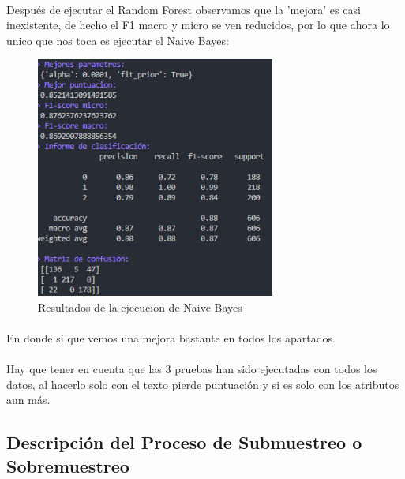 \documentclass{report}
\begin{document}
{{                \paragraph*{}{
                Después de ejecutar el Random Forest observamos que la 'mejora' es casi inexistente, de hecho el F1 macro y micro se ven reducidos, por lo que ahora lo unico que nos toca es ejecutar el Naive Bayes:
                }
                \begin{figure}[H]
                    \centering
                    \includegraphics[width=0.7\textwidth]{img/SMOTE.png}
                    \caption{Resultados de la ejecucion de Naive Bayes}
                \end{figure}
                \paragraph*{}{
                    En donde si que vemos una mejora bastante en todos los apartados.
                }
               \paragraph*{}{
                   Hay que tener en cuenta que las 3 pruebas han sido ejecutadas con todos los datos, al hacerlo solo con el texto pierde puntuación y si es solo con los atributos aun más.
               }
            \clearpage\subsection{Descripción del Proceso de Submuestreo o Sobremuestreo}
}}
\end{document}
